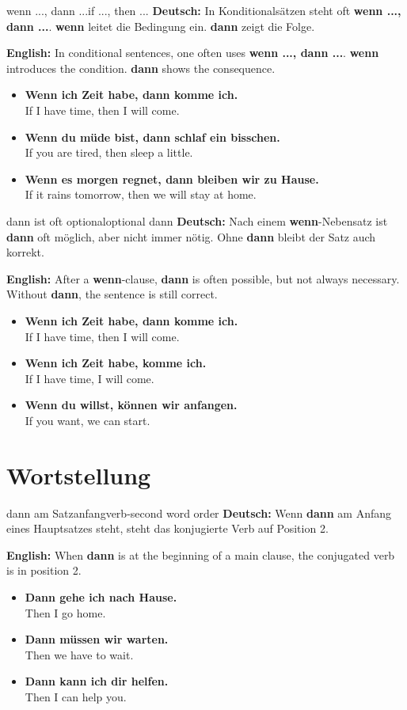 \documentclass[a4paper,11pt]{article}
\newcommand{\GermanText}[1]{\textbf{Deutsch: }#1\par}
\newcommand{\EnglishText}[1]{{\small\color{SoftGray}\textbf{English: }#1\par}}
\newcommand{\ExampleItem}[2]{\item \textbf{#1}\\{\small\color{SoftGray}#2}}
\begin{document}
\begin{grammarentry}{wenn ..., dann ...}{if ..., then ...}
\GermanText{In Konditionalsätzen steht oft \textbf{wenn ..., dann ...}. \textbf{wenn} leitet die Bedingung ein. \textbf{dann} zeigt die Folge.}
\EnglishText{In conditional sentences, one often uses \textbf{wenn ..., dann ...}. \textbf{wenn} introduces the condition. \textbf{dann} shows the consequence.}

\begin{exbox}
\begin{itemize}
    \ExampleItem{Wenn ich Zeit habe, dann komme ich.}{If I have time, then I will come.}
    \ExampleItem{Wenn du müde bist, dann schlaf ein bisschen.}{If you are tired, then sleep a little.}
    \ExampleItem{Wenn es morgen regnet, dann bleiben wir zu Hause.}{If it rains tomorrow, then we will stay at home.}
\end{itemize}
\end{exbox}
\end{grammarentry}

\begin{grammarentry}{dann ist oft optional}{optional dann}
\GermanText{Nach einem \textbf{wenn}-Nebensatz ist \textbf{dann} oft möglich, aber nicht immer nötig. Ohne \textbf{dann} bleibt der Satz auch korrekt.}
\EnglishText{After a \textbf{wenn}-clause, \textbf{dann} is often possible, but not always necessary. Without \textbf{dann}, the sentence is still correct.}

\begin{exbox}
\begin{itemize}
    \ExampleItem{Wenn ich Zeit habe, dann komme ich.}{If I have time, then I will come.}
    \ExampleItem{Wenn ich Zeit habe, komme ich.}{If I have time, I will come.}
    \ExampleItem{Wenn du willst, können wir anfangen.}{If you want, we can start.}
\end{itemize}
\end{exbox}
\end{grammarentry}

\section{Wortstellung}

\begin{grammarentry}{dann am Satzanfang}{verb-second word order}
\GermanText{Wenn \textbf{dann} am Anfang eines Hauptsatzes steht, steht das konjugierte Verb auf Position 2.}
\EnglishText{When \textbf{dann} is at the beginning of a main clause, the conjugated verb is in position 2.}

\begin{exbox}
\begin{itemize}
    \ExampleItem{Dann gehe ich nach Hause.}{Then I go home.}
    \ExampleItem{Dann müssen wir warten.}{Then we have to wait.}
    \ExampleItem{Dann kann ich dir helfen.}{Then I can help you.}
\end{itemize}
\end{exbox}
\end{grammarentry}
\end{document}
